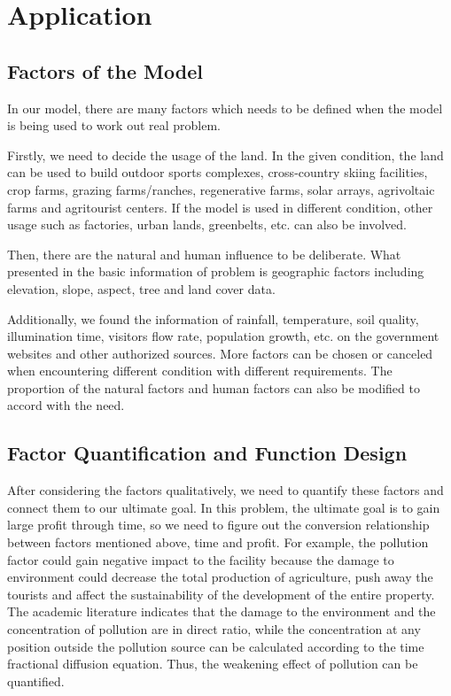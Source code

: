 \documentclass[./main.tex]{subfiles}
\begin{document}
    \section{Application}
    \subsection{Factors of the Model}

    In our model, there are many factors which needs to be defined when the model is being used to work out real problem.

    Firstly, we need to decide the usage of the land.
    In the given condition, the land can be used to build outdoor sports complexes, cross-country skiing facilities,
    crop farms, grazing farms/ranches, regenerative farms, solar arrays, agrivoltaic farms and agritourist centers.
    If the model is used in different condition, other usage such as factories, urban lands, greenbelts, etc.
    can also be involved.

    Then, there are the natural and human influence to be deliberate.
    What presented in the basic information of problem is geographic factors including elevation, slope, aspect, tree and land cover data.

    Additionally, we found the information of rainfall, temperature, soil quality, illumination time, visitors flow rate, population growth, etc.
    on the government websites and other authorized sources.
    More factors can be chosen or canceled when encountering different condition with different requirements.
    The proportion of the natural factors and human factors can also be modified to accord with the need.

    \subsection{Factor Quantification and Function Design}

    After considering the factors qualitatively, we need to quantify these factors and connect them to our ultimate goal.
    In this problem, the ultimate goal is to gain large profit through time, so we need to figure out the conversion
    relationship between factors mentioned above, time and profit.
    For example, the pollution factor could gain negative impact to the facility because the damage to environment
    could decrease the total production of agriculture, push away the tourists and affect the sustainability of the
    development of the entire property.
    The academic literature indicates that the damage to the environment and the concentration of pollution are in
    direct ratio, while the concentration at any position outside the pollution source can be calculated according to the time fractional diffusion equation.
    Thus, the weakening effect of pollution can be quantified.
\end{document}
